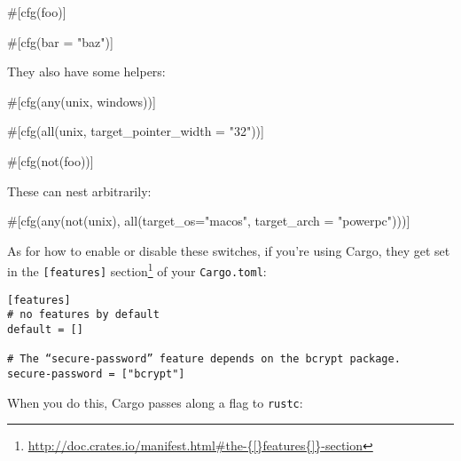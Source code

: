 \documentclass[a4paper,]{book}
\newenvironment{Shaded}{\begin{snugshade}}{\end{snugshade}}
\newcommand{\StringTok}[1]{\textcolor[rgb]{0.31,0.60,0.02}{{#1}}}
\newcommand{\OtherTok}[1]{\textcolor[rgb]{0.56,0.35,0.01}{{#1}}}
\newcommand{\NormalTok}[1]{{#1}}
\renewcommand{\href}[2]{#2\footnote{\url{#1}}}
\begin{document}
\begin{Shaded}
\begin{Highlighting}[]
\OtherTok{#[}\NormalTok{cfg}\OtherTok{(}\NormalTok{foo}\OtherTok{)]}

\OtherTok{#[}\NormalTok{cfg}\OtherTok{(}\NormalTok{bar }\OtherTok{=} \StringTok{"baz"}\OtherTok{)]}
\end{Highlighting}
\end{Shaded}

They also have some helpers:

\begin{Shaded}
\begin{Highlighting}[]
\OtherTok{#[}\NormalTok{cfg}\OtherTok{(}\NormalTok{any}\OtherTok{(}\NormalTok{unix}\OtherTok{,} \NormalTok{windows}\OtherTok{))]}

\OtherTok{#[}\NormalTok{cfg}\OtherTok{(}\NormalTok{all}\OtherTok{(}\NormalTok{unix}\OtherTok{,} \NormalTok{target_pointer_width }\OtherTok{=} \StringTok{"32"}\OtherTok{))]}

\OtherTok{#[}\NormalTok{cfg}\OtherTok{(}\NormalTok{not}\OtherTok{(}\NormalTok{foo}\OtherTok{))]}
\end{Highlighting}
\end{Shaded}

These can nest arbitrarily:

\begin{Shaded}
\begin{Highlighting}[]
\OtherTok{#[}\NormalTok{cfg}\OtherTok{(}\NormalTok{any}\OtherTok{(}\NormalTok{not}\OtherTok{(}\NormalTok{unix}\OtherTok{),} \NormalTok{all}\OtherTok{(}\NormalTok{target_os}\OtherTok{=}\StringTok{"macos"}\OtherTok{,} \NormalTok{target_arch }\OtherTok{=} \StringTok{"powerpc"}\OtherTok{)))]}
\end{Highlighting}
\end{Shaded}

As for how to enable or disable these switches, if you're using Cargo,
they get set in the
\href{http://doc.crates.io/manifest.html\#the-{[}features{]}-section}{\texttt{{[}features{]}}
section} of your \texttt{Cargo.toml}:

\begin{verbatim}
[features]
# no features by default
default = []

# The “secure-password” feature depends on the bcrypt package.
secure-password = ["bcrypt"]
\end{verbatim}

When you do this, Cargo passes along a flag to \texttt{rustc}:
\end{document}
